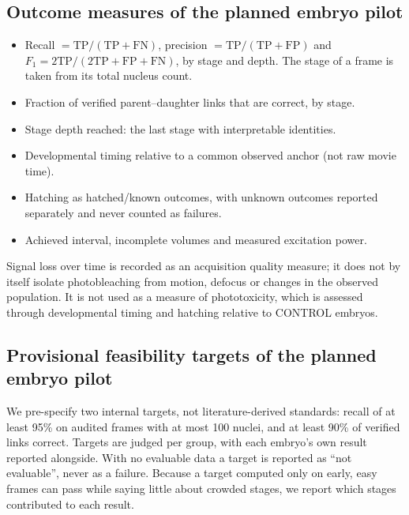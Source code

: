 \documentclass[11pt]{article}
\begin{document}
\subsection{Outcome measures of the planned embryo pilot}
\begin{itemize}
  \item Recall $=\mathrm{TP}/(\mathrm{TP}+\mathrm{FN})$, precision
        $=\mathrm{TP}/(\mathrm{TP}+\mathrm{FP})$ and
        $F_1=2\mathrm{TP}/(2\mathrm{TP}+\mathrm{FP}+\mathrm{FN})$, by stage and depth.
        The stage of a frame is taken from its total nucleus count.
  \item Fraction of verified parent--daughter links that are correct, by stage.
  \item Stage depth reached: the last stage with interpretable identities.
  \item Developmental timing relative to a common observed anchor (not raw movie time).
  \item Hatching as hatched/known outcomes, with unknown outcomes reported
        separately and never counted as failures.
  \item Achieved interval, incomplete volumes and measured excitation power.
\end{itemize}
Signal loss over time is recorded as an acquisition quality measure; it does not
by itself isolate photobleaching from motion, defocus or changes in the observed
population. It is not used as a measure of phototoxicity, which is assessed through
developmental timing and hatching relative to CONTROL embryos.

\subsection{Provisional feasibility targets of the planned embryo pilot}
We pre-specify two internal targets, not literature-derived standards: recall of at
least 95\% on audited frames with at most 100 nuclei, and at least 90\% of verified
links correct. Targets are judged per group, with each embryo's own result reported
alongside. With no evaluable data a target is reported as ``not evaluable'', never
as a failure. Because a target computed only on early, easy frames can pass while
saying little about crowded stages, we report which stages contributed to each
result.
\end{document}
